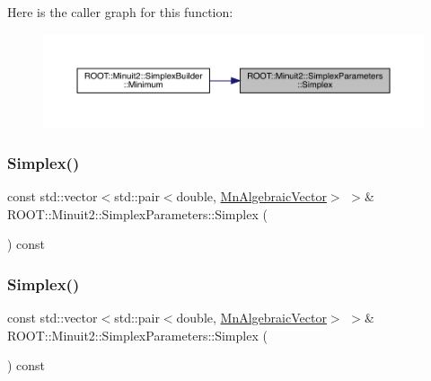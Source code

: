 Here is the caller graph for this function\+:
\nopagebreak
\begin{figure}[H]
\begin{center}
\leavevmode
\includegraphics[width=350pt]{d7/da2/classROOT_1_1Minuit2_1_1SimplexParameters_a873b8883c6932b879348e73d36d86afb_icgraph}
\end{center}
\end{figure}
\mbox{\label{classROOT_1_1Minuit2_1_1SimplexParameters_a873b8883c6932b879348e73d36d86afb}} 
\subsubsection{\texorpdfstring{Simplex()}{Simplex()}\hspace{0.1cm}{\footnotesize\ttfamily [2/3]}}
{\footnotesize\ttfamily const std\+::vector$<$std\+::pair$<$double, \mbox{\hyperlink{namespaceROOT_1_1Minuit2_a62ed97730a1ca8d3fbaec64a19aa11c9}{Mn\+Algebraic\+Vector}}$>$ $>$\& R\+O\+O\+T\+::\+Minuit2\+::\+Simplex\+Parameters\+::\+Simplex (\begin{DoxyParamCaption}{ }\end{DoxyParamCaption}) const\hspace{0.3cm}{\ttfamily [inline]}}

\mbox{\label{classROOT_1_1Minuit2_1_1SimplexParameters_a873b8883c6932b879348e73d36d86afb}} 
\subsubsection{\texorpdfstring{Simplex()}{Simplex()}\hspace{0.1cm}{\footnotesize\ttfamily [3/3]}}
{\footnotesize\ttfamily const std\+::vector$<$std\+::pair$<$double, \mbox{\hyperlink{namespaceROOT_1_1Minuit2_a62ed97730a1ca8d3fbaec64a19aa11c9}{Mn\+Algebraic\+Vector}}$>$ $>$\& R\+O\+O\+T\+::\+Minuit2\+::\+Simplex\+Parameters\+::\+Simplex (\begin{DoxyParamCaption}{ }\end{DoxyParamCaption}) const\hspace{0.3cm}{\ttfamily [inline]}}


